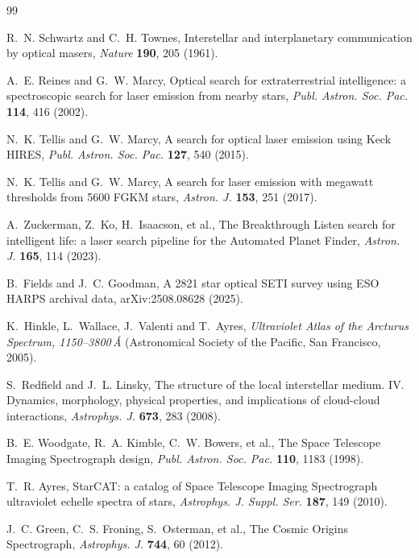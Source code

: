 \documentclass[3p,11pt]{elsarticle}
\begin{document}
\begin{thebibliography}{99}\small\raggedright
\setlength{\itemsep}{1pt}

R.~N. Schwartz and C.~H. Townes, Interstellar and interplanetary communication by
optical masers, \emph{Nature} \textbf{190}, 205 (1961).

A.~E. Reines and G.~W. Marcy, Optical search for extraterrestrial intelligence: a
spectroscopic search for laser emission from nearby stars, \emph{Publ. Astron. Soc.
Pac.} \textbf{114}, 416 (2002).

N.~K. Tellis and G.~W. Marcy, A search for optical laser emission using Keck HIRES,
\emph{Publ. Astron. Soc. Pac.} \textbf{127}, 540 (2015).

N.~K. Tellis and G.~W. Marcy, A search for laser emission with megawatt thresholds from
5600 FGKM stars, \emph{Astron. J.} \textbf{153}, 251 (2017).

A.~Zuckerman, Z.~Ko, H.~Isaacson, et al., The Breakthrough Listen search for
intelligent life: a laser search pipeline for the Automated Planet Finder,
\emph{Astron. J.} \textbf{165}, 114 (2023).

B.~Fields and J.~C. Goodman, A 2821 star optical SETI survey using ESO HARPS archival
data, arXiv:2508.08628 (2025).

K.~Hinkle, L.~Wallace, J.~Valenti and T.~Ayres, \emph{Ultraviolet Atlas of the Arcturus
Spectrum, 1150--3800\,\AA} (Astronomical Society of the Pacific, San Francisco, 2005).

S.~Redfield and J.~L. Linsky, The structure of the local interstellar medium. IV.
Dynamics, morphology, physical properties, and implications of cloud-cloud
interactions, \emph{Astrophys. J.} \textbf{673}, 283 (2008).

B.~E. Woodgate, R.~A. Kimble, C.~W. Bowers, et al., The Space Telescope Imaging
Spectrograph design, \emph{Publ. Astron. Soc. Pac.} \textbf{110}, 1183 (1998).

T.~R. Ayres, StarCAT: a catalog of Space Telescope Imaging Spectrograph ultraviolet
echelle spectra of stars, \emph{Astrophys. J. Suppl. Ser.} \textbf{187}, 149 (2010).

J.~C. Green, C.~S. Froning, S.~Osterman, et al., The Cosmic Origins Spectrograph,
\emph{Astrophys. J.} \textbf{744}, 60 (2012).


\end{thebibliography}
\end{document}
